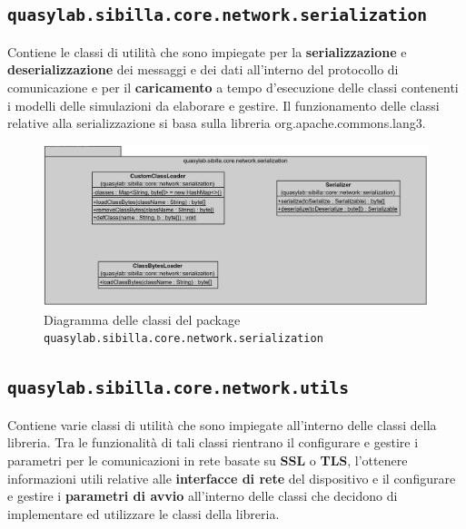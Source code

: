 \subsection{\texttt{quasylab.sibilla.core.network.serialization}} Contiene le classi di utilità che sono impiegate per la \textbf{serializzazione} e \textbf{deserializzazione} dei messaggi e dei dati all’interno del protocollo di comunicazione e per il \textbf{caricamento} a tempo d’esecuzione delle classi contenenti i modelli delle simulazioni da elaborare e gestire. Il funzionamento delle classi relative alla serializzazione si basa sulla libreria org.apache.commons.lang3.

\begin{figure}[H]
    \includegraphics[width=\linewidth]{images/quasylab.sibilla.core.network.serialization.png}
    \captionsetup{justification=centering}
    \caption{Diagramma delle classi del package \texttt{quasylab.sibilla.core.network.serialization}}
  \end{figure}

\subsection{\texttt{quasylab.sibilla.core.network.utils}} Contiene varie classi di utilità che sono impiegate all’interno delle classi della libreria. Tra le funzionalità di tali classi rientrano il configurare e gestire i parametri per le comunicazioni in rete basate su \textbf{SSL} o \textbf{TLS}, l’ottenere informazioni utili relative alle \textbf{interfacce di rete} del dispositivo e il configurare e gestire i \textbf{parametri di avvio} all’interno delle classi che decidono di implementare ed utilizzare le classi della libreria.


